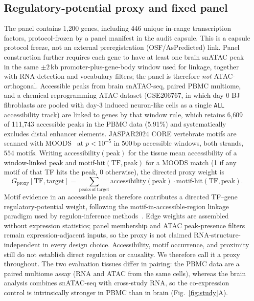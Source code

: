 \documentclass[fleqn,10pt,lineno]{wlpeerj}
\begin{document}
\subsection{Regulatory-potential proxy and fixed panel}\label{sec:proxy}
The panel contains 1,200 genes, including 446 unique in-range transcription factors,
protocol-frozen by a panel manifest in the audit capsule.
This is a capsule protocol freeze, not an external preregistration
(OSF/AsPredicted) link. Panel construction further requires each gene to have at least one brain
snATAC peak in the same $\pm2$\,kb promoter-plus-gene-body window used for linkage, together with
RNA-detection and vocabulary filters; the panel is therefore \emph{not} ATAC-orthogonal. Accessible
peaks from brain snATAC-seq, paired PBMC multiome, and a chemical reprogramming ATAC dataset
(GSE206767, in which day-0 BJ fibroblasts are pooled with day-3 induced neuron-like cells as a
single \texttt{ALL} accessibility track) are linked to genes by that window rule, which retains
6{,}609 of 111{,}743 accessible peaks in the PBMC data (5.91\%) and systematically excludes distal
enhancer elements. JASPAR2024 CORE vertebrate motifs are scanned with
MOODS~\citep{rauluseviciute2024jaspar,korhonen2009moods} at $p<10^{-5}$ in $500$\,bp accessible
windows, both strands, $554$ motifs. Writing $\mathrm{accessibility}(\mathrm{peak})$ for the
tissue mean accessibility of a window-linked peak and $\mathrm{motif\text{-}hit}(\mathrm{TF},\mathrm{peak})$
for a MOODS match (1 if any motif of that TF hits the peak, 0 otherwise), the directed proxy weight
is
\[
G_{\mathrm{proxy}}[\mathrm{TF},\mathrm{target}]
=
\sum_{\mathrm{peaks\ of\ target}}
\mathrm{accessibility}(\mathrm{peak})\cdot\mathrm{motif\text{-}hit}(\mathrm{TF},\mathrm{peak}).
\]
Motif evidence in an accessible peak therefore contributes a directed TF--gene
regulatory-potential weight, following the motif-in-accessible-region linkage paradigm used by
regulon-inference methods~\citep{aibar2017scenic}. Edge
weights are assembled without expression statistics; panel membership and ATAC peak-presence
filters remain expression-adjacent inputs, so the proxy is not claimed RNA-structure-independent in
every design choice. Accessibility, motif occurrence, and proximity still do not establish direct
regulation or causality. We therefore call it a proxy throughout. The two evaluation tissues differ
in pairing: the PBMC data are a paired multiome assay (RNA and ATAC from the same cells), whereas
the brain analysis combines snATAC-seq with cross-study RNA, so the co-expression control is
intrinsically stronger in PBMC than in brain (Fig.~\ref{fig:study}A).
\end{document}

